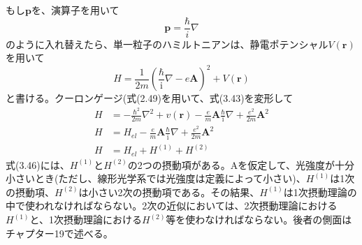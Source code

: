 \documentclass[11pt,a4j,uplatex]{jsarticle}
\begin{document}
もし$\bm{p}$を、演算子を用いて
\begin{equation}
  \bm{p}=\frac{\hbar}{i}\nabla\tag{3.42}
\end{equation}
のように入れ替えたら、単一粒子のハミルトニアンは、静電ポテンシャル$V(\bm{r})$を用いて
\begin{equation}
  H=\frac{1}{2m}(\frac{\hbar}{\mathrm{i}}\nabla-e\bm{A})^2+V(\bm{r})\tag{3.43}
\end{equation}
と書ける。クーロンゲージ(式(2.49)を用いて、式(3.43)を変形して
  \begin{align}
    H&=-\frac{\hbar^2}{2m}\nabla^2+v(\bm{r})-\frac{e}{m}\bm{A}\frac{\hbar}{\mathrm{i}}\nabla+\frac{e^2}{2m}\bm{A}^2\tag{3.44}\\
    H&=H_{el}-\frac{e}{m}\bm{A}\frac{\hbar}{\mathrm{i}}\nabla+\frac{e^2}{2m}\bm{A}^2\tag{3.45}\\
    H&=H_{el}+H^{(1)}+H^{(2)}\tag{3.46}
  \end{align}
式(3.46)には、$H^{(1)}$と$H^{(2)}$の2つの摂動項がある。Aを仮定して、光強度が十分小さいとき(ただし、線形光学系では光強度は定義によって小さい)、$H^{(1)}$は1次の摂動項、$H^{(2)}$は小さい2次の摂動項である。その結果、$H^{(1)}$は1次摂動理論の中で使われなければならない。2次の近似においては、2次摂動理論における$H^{(1)}$と、1次摂動理論における$H^{(2)}$等を使わなければならない。後者の側面はチャプター19で述べる。%
\end{document}
